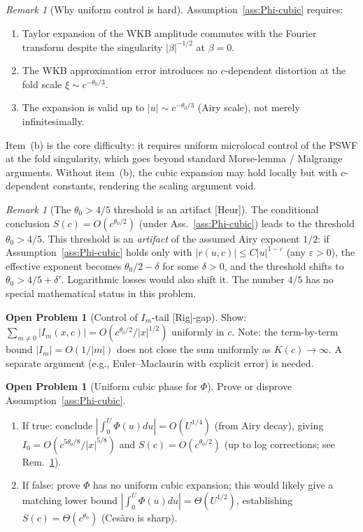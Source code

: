 \documentclass[12pt,a4paper]{amsart}
\theoremstyle{definition}
\newtheorem{problem}[theorem]{Open Problem}
\theoremstyle{remark}
\newtheorem{remark}[theorem]{Remark}
\newcommand{\Rig}{\textup{[Rig]}}
\newcommand{\Heur}{\textup{[Heur]}}
\begin{document}
\begin{remark}[Why uniform
  control is hard]
\label{rem:hard}
Assumption~\ref{ass:Phi-cubic}
requires:
\begin{enumerate}[\rm(a)]
\item Taylor expansion of the
  WKB amplitude commutes
  with the Fourier transform
  despite the singularity
  $|\beta|^{-1/2}$ at $\beta=0$.
\item The WKB approximation
  error introduces no
  $c$-dependent distortion
  at the fold scale
  $\xi\sim c^{-\theta_0/3}$.
\item The expansion is valid
  up to $|u|\sim c^{-\theta_0/3}$
  (Airy scale), not merely
  infinitesimally.
\end{enumerate}
Item~(b) is the core difficulty:
it requires uniform microlocal
control of the PSWF at the
fold singularity,
which goes beyond standard
Morse-lemma / Malgrange arguments.
Without item~(b), the cubic
expansion may hold locally
but with $c$-dependent constants,
rendering the scaling argument
void.
\end{remark}

\begin{remark}[The $\theta_0>4/5$
  threshold is an artifact \Heur]
\label{rem:theta-threshold}
The conditional conclusion
$S(c)=O(c^{\theta_0/2})$
(under Ass.~\ref{ass:Phi-cubic})
leads to the threshold
$\theta_0>4/5$.
This threshold is an
\emph{artifact} of the
assumed Airy exponent $1/2$:
if Assumption~\ref{ass:Phi-cubic}
holds only with
$|r(u,c)|\le C|u|^{1-\varepsilon}$
(any $\varepsilon>0$),
the effective exponent
becomes $\theta_0/2-\delta$
for some $\delta>0$,
and the threshold shifts to
$\theta_0>4/5+\delta'$.
Logarithmic losses would
also shift it.
The number $4/5$ has no
special mathematical
status in this problem.
\end{remark}

\begin{problem}[Control of
  $I_m$-tail \Rig-gap]
\label{prob:Im-tail}
Show:
$\sum_{m\ne 0}|I_m(x,c)|
=O(c^{\theta_0/2}/|x|^{1/2})$
uniformly in $c$.
Note: the term-by-term bound
$|I_m|=O(1/|m|)$
does not close the sum
uniformly as $K(c)\to\infty$.
A separate argument
(e.g., Euler--Maclaurin
with explicit error)
is needed.
\end{problem}

\begin{problem}[Uniform cubic
  phase for $\Phi$]
\label{prob:Phi-cubic}
Prove or disprove
Assumption~\ref{ass:Phi-cubic}.
\begin{enumerate}[\rm(A)]
\item If true: conclude
  $|\int_0^U\Phi(u)du|
  =O(U^{1/4})$
  (from Airy decay),
  giving $I_0=O(c^{5\theta_0/8}/|x|^{5/8})$
  and $S(c)=O(c^{\theta_0/2})$
  (up to log corrections;
  see Rem.~\ref{rem:theta-threshold}).
\item If false: prove
  $\Phi$ has no uniform
  cubic expansion;
  this would likely give
  a matching lower bound
  $|\int_0^U\Phi(u)du|
  =\Theta(U^{1/2})$,
  establishing
  $S(c)=\Theta(c^{\theta_0})$
  (Ces\`aro is sharp).
\end{enumerate}
\end{problem}
\end{document}
